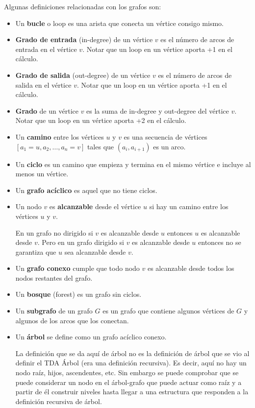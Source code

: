 Algunas definiciones relacionadas con los grafos son:
\begin{itemize}
\item Un \textbf{bucle} o loop es una arista que conecta un vértice consigo mismo.
\item \textbf{Grado de entrada} (in-degree) de un vértice $v$ es el número de arcos de entrada en el vértice $v$. Notar que un loop en un vértice aporta +1 en el cálculo.
\item \textbf{Grado de salida} (out-degree) de un vértice $v$ es el número de arcos de salida en el vértice $v$.
Notar que un loop en un vértice aporta +1 en el cálculo.
\item \textbf{Grado} de un vértice $v$ es la suma de in-degree y out-degree del vértice $v$. Notar que un loop en un vértice aporta +2 en el cálculo.
\item Un \textbf{camino} entre los vértices $u$ y $v$ es una secuencia de vértices $[a_1=u, a_2, \ldots, a_n=v]$ tales que $(a_i, a_{i+1})$ es un arco.

\item Un \textbf{ciclo} es un camino que empieza y termina en el mismo vértice e incluye al menos un vértice.

\item Un \textbf{grafo acíclico} es aquel que no tiene ciclos.

\item Un nodo  $v$ es \textbf{alcanzable} desde el vértice $u$ si hay un camino entre los vértices $u$ y $v$.

En un grafo no dirigido si $v$ es alcanzable desde $u$ entonces  $u$ es alcanzable desde $v$.
Pero en un grafo dirigido si $v$ es alcanzable desde $u$ entonces  no se garantiza que $u$ sea alcanzable desde $v$.

\item Un \textbf{grafo conexo} cumple que todo nodo $v$ es alcanzable desde todos los nodos restantes del grafo.

\item Un \textbf{bosque} (forest) es un grafo sin ciclos.

\item Un \textbf{subgrafo} de un grafo $G$ es un grafo que contiene algunos vértices  de $G$ y algunos de los arcos que los conectan.

\item Un \textbf{árbol} se  define como un grafo acíclico conexo.

La definición que se da aquí de árbol no es la definición de árbol que se vio al definir el TDA Árbol (era una definición recursiva). Es decir, aquí no hay un nodo raíz, hijos, ascendentes, etc. Sin embargo se puede comprobar que se puede considerar un nodo en el árbol-grafo que puede actuar como raíz y a partir de él construir niveles hasta llegar a una estructura que responden a la definición recursiva de árbol.


\end{itemize}
